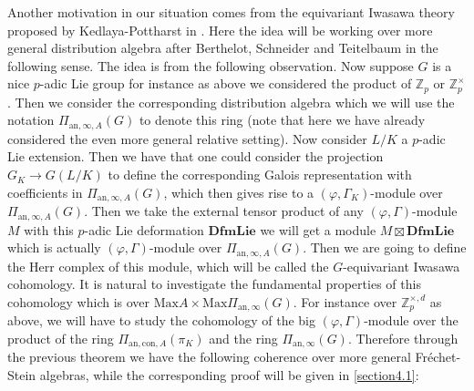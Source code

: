\documentclass[12pt]{amsart}
\theoremstyle{definition}
\numberwithin{equation}{section}
\begin{document}
\indent Another motivation in our situation comes from the equivariant Iwasawa theory proposed by Kedlaya-Pottharst in \cite{KP1}. Here the idea will be working over more general distribution algebra after Berthelot, Schneider and Teitelbaum in the following sense. The idea is from the following observation. Now suppose $G$ is a nice $p$-adic Lie group for instance as above we considered the product of $\mathbb{Z}_p$ or $\mathbb{Z}_p^\times$. Then we consider the corresponding distribution algebra which we will use the notation $\Pi_{\mathrm{an},\infty,A}(G)$ to denote this ring (note that here we have already considered the even more general relative setting). Now consider $L/K$ a $p$-adic Lie extension. Then we have that one could consider the projection $G_{K}\rightarrow G(L/K)$ to define the corresponding Galois representation with coefficients in $\Pi_{\mathrm{an},\infty,A}(G)$, which then gives rise to a $(\varphi,\Gamma_K)$-module over $\Pi_{\mathrm{an},\infty,A}(G)$. Then we take the external tensor product of any $(\varphi,\Gamma)$-module $M$ with this $p$-adic Lie deformation $\mathbf{DfmLie}$ we will get a module $M\boxtimes \mathbf{DfmLie}$ which is actually $(\varphi,\Gamma)$-module over $\Pi_{\mathrm{an},\infty,A}(G)$. Then we are going to define the Herr complex of this module, which will be called the $G$-equivariant Iwasawa cohomology. It is natural to investigate the fundamental properties of this cohomology which is over $\mathrm{Max}A\times \mathrm{Max}\Pi_{\mathrm{an},\infty}(G)$. For instance over $\mathbb{Z}_p^{\times,d}$ as above, we will have to study the cohomology of the big $(\varphi,\Gamma)$-module over the product of the ring $\Pi_{\mathrm{an},\mathrm{con},A}(\pi_K)$ and the ring $\Pi_{\mathrm{an},\infty}(G)$. Therefore through the previous theorem we have the following coherence over more general Fr\'echet-Stein algebras, while the corresponding proof will be given in \cref{section4.1}: 
\end{document}
